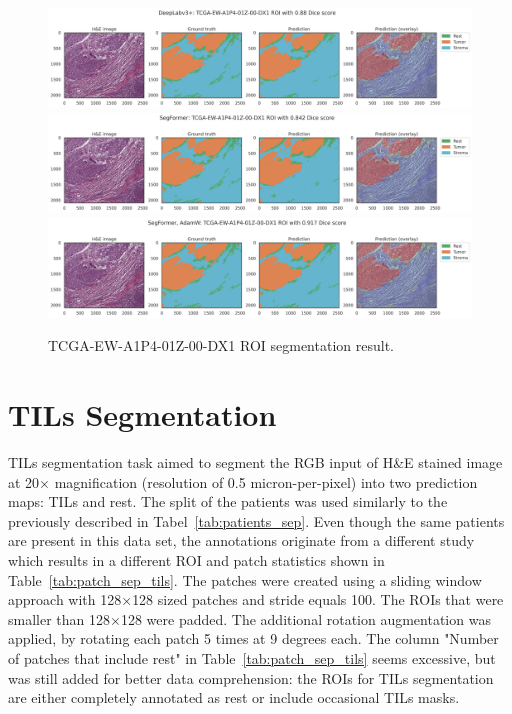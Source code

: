 \begin{figure}[H]
\includegraphics[width=\linewidth]{figures/tissue/deeplabv3+_dice_tcga_TCGA-EW-A1P4-01Z-00-DX13E9AE553-83D4-4B09-AB7F-D096BCE3BC4D_[8630,_17717,_11173,_19809]_check.png}
\includegraphics[width=\linewidth]{figures/tissue/segformer_dice_tcga_TCGA-EW-A1P4-01Z-00-DX13E9AE553-83D4-4B09-AB7F-D096BCE3BC4D_[8630,_17717,_11173,_19809]_check.png}
\includegraphics[width=\linewidth]{figures/tissue/segformer,_adamw_dice_tcga_TCGA-EW-A1P4-01Z-00-DX13E9AE553-83D4-4B09-AB7F-D096BCE3BC4D_[8630,_17717,_11173,_19809]_check.png}

\caption{TCGA-EW-A1P4-01Z-00-DX1 ROI segmentation result.}
\label{fig:TCGA-EW-A1P4}
\end{figure}



\section{TILs Segmentation}
TILs segmentation task aimed to segment the RGB input of H\&E stained image at 20$\times$ magnification
(resolution of 0.5 micron-per-pixel) into two prediction maps: TILs and rest.
The split of the patients was used similarly to the previously described in
Tabel~\ref*{tab:patients_sep}. Even though the same patients are present in
this data set, the annotations originate from a different
study which results in a different ROI and patch statistics shown in
Table~\ref*{tab:patch_sep_tils}. The patches were created using a sliding
window approach with 128$\times$128 sized patches
and stride equals 100. The ROIs that were smaller than 128$\times$128
were padded. The additional rotation augmentation was applied,
by rotating each patch 5 times at 9 degrees each.
The column "Number of patches that include rest" in Table~\ref*{tab:patch_sep_tils}
seems excessive, but was still added
for better data comprehension: the ROIs for TILs segmentation are either
completely annotated as rest or include occasional TILs masks.

